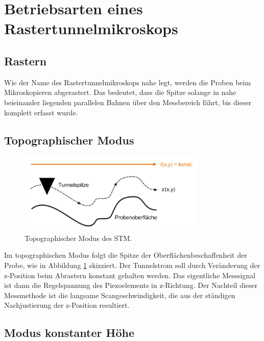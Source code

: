         

\section{Betriebsarten eines Rastertunnelmikroskops}
	\subsection{Rastern}
	Wie der Name des Rastertunnelmikroskops nahe legt, werden die Proben beim Mikroskopieren abgerastert. Das bedeutet, dass die Spitze solange in nahe beieinander liegenden parallelen Bahnen über den Messbereich fährt, bis dieser komplett erfasst wurde.
    \subsection{Topographischer Modus}
   

\begin{figure}[H]
    \centering
    \includegraphics[width=0.8\textwidth]{Abb/topo.png}
    \caption{Topographischer Modus des STM. \cite{beschr}}
    \label{topo}
\end{figure}
Im topographischen Modus folgt die Spitze der Oberflächenbeschaffenheit der Probe,
wie in Abbildung \ref{topo} skizziert. Der Tunnelstrom soll durch Veränderung der 
z-Position beim Abrastern konstant gehalten werden. Das eigentliche Messsignal 
ist dann die Regelspannung des Piezoelements in z-Richtung. Der Nachteil dieser 
Messmethode ist die langsame Scangeschwindigkeit, die aus der ständigen 
Nachjustierung der z-Position resultiert.

    \subsection{Modus konstanter Höhe}

